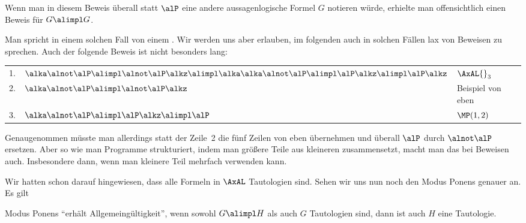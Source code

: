 Wenn man in diesem Beweis überall statt $\alP$
eine andere aussagenlogische Formel $G$
notieren würde, erhielte man offensichtlich einen Beweis für
$G\alimpl G$.


Man spricht in einem solchen Fall von einem .
Wir werden uns aber erlauben, im folgenden auch in solchen Fällen
lax von Beweisen zu sprechen.
%
Auch der folgende Beweis ist nicht besonders lang:

\begin{tabular}{rll}
1. & $\alka \alnot\alP \alimpl \alnot\alP \alkz\alimpl 
     \alka \alka \alnot\alP \alimpl \alP \alkz\alimpl \alP \alkz$ & $\AxAL{}_3$ \\
2. & $\alka \alnot\alP \alimpl \alnot\alP \alkz$ & Beispiel von eben \\
3. & $\alka \alnot\alP \alimpl \alP \alkz\alimpl \alP$  & $\MP(1,2)$ \\
\end{tabular}

\noindent
Genaugenommen müsste man allerdings statt der Zeile~2 die fünf Zeilen
von eben übernehmen und überall $\alP$ durch $\alnot\alP$ ersetzen.
%
Aber so wie man Programme strukturiert, indem man größere Teile aus
kleineren zusammensetzt, macht man das bei Beweisen auch.
%
Insbesondere dann, wenn man kleinere Teil mehrfach verwenden kann.

Wir hatten schon darauf hingewiesen, dass alle Formeln in $\AxAL$
Tautologien sind.
%
Sehen wir uns nun noch den Modus Ponens genauer an. 
%
Es gilt
%
\begin{lemma}
  Modus Ponens "`erhält Allgemeingültigkeit"', \dh wenn sowohl
  $G\alimpl H$
  als auch $G$ Tautologien sind, dann ist auch $H$ eine Tautologie.
\end{lemma}

